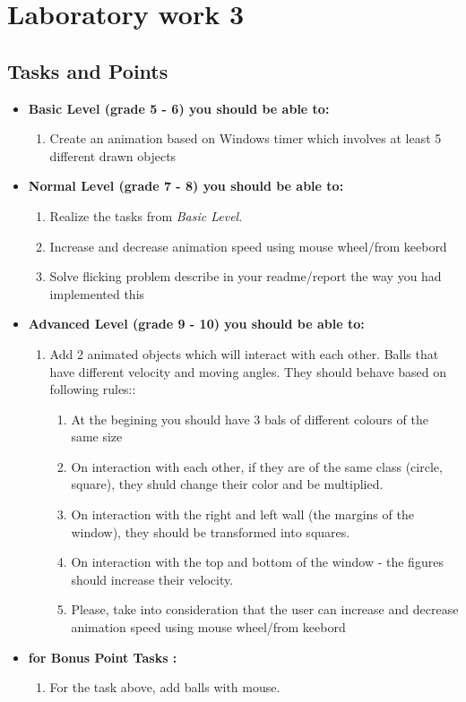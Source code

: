 \section{Laboratory work 3}

\subsection{Tasks and Points}
\begin{itemize}
\item \textbf{Basic Level (grade 5 - 6) you should be able to:}
	\begin{enumerate}
	\item Create an animation based on Windows timer which involves at least 5 different drawn objects
      \end{enumerate}
\item \textbf{Normal Level (grade 7 - 8) you should be able to:}
      \begin{enumerate}
    \item Realize the tasks from \textit{Basic Level}.
    \item Increase and decrease animation speed using mouse wheel/from keebord
    \item Solve flicking problem describe in your readme/report the way you had implemented this
          \end{enumerate}
\item \textbf{Advanced Level (grade 9 - 10) you should be able to:}
      \begin{enumerate}
    \item Add 2 animated objects which will interact with each other. Balls that have different velocity and moving angles. They should behave based on following rules::
    	\begin{enumerate}
        \item At the begining you should have 3 bals of different colours of the same size
        \item On interaction with each other, if they are of the same class (circle, square), they shuld change their color and be multiplied.
        \item On interaction with the right and left wall (the margins of the window), they should be transformed into squares.
        \item On interaction with the top and bottom of the window - the figures should increase their velocity.
        \item Please, take into consideration that the user can increase and decrease animation speed using mouse wheel/from keebord
        \end{enumerate}
          \end{enumerate}
\item \textbf{for Bonus Point Tasks :}
\begin{enumerate}
	\item For the task above, add balls with mouse.
    \end{enumerate}
  \end{itemize}  

\clearpage